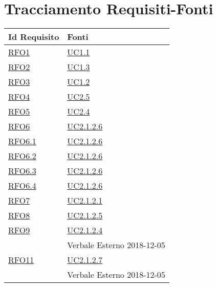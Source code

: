 \section{Tracciamento Requisiti-Fonti}
\normalsize
\begin{longtable}{|>{\centering}m{5cm}|m{5cm}<{\centering}|}
	\hline
	\textbf{Id Requisito} & \textbf{Fonti}\\
	\hline
	\endhead
	\hyperlink{RFO1}{RFO1} & \hyperref[UC1.1]{UC1.1}\\ \hline
	
	\hyperlink{RFO2}{RFO2} & \hyperref[UC1.3]{UC1.3}\\ \hline
	
	\hyperlink{RFO3}{RFO3} & \hyperref[UC1.2]{UC1.2}\\ \hline
	
	\hyperlink{RFO4}{RFO4} & \hyperref[UC2.5]{UC2.5}\\ \hline
	
	\hyperlink{RFO5}{RFO5} & \hyperref[UC2.4]{UC2.4}\\ \hline
	
	\hyperlink{RFO6}{RFO6} & \hyperref[UC2.1.2.6]{UC2.1.2.6}\\ \hline
	
	\hyperlink{RFO6.1}{RFO6.1} & \hyperref[UC2.1.2.6]{UC2.1.2.6}\\ \hline
	
	\hyperlink{RFO6.2}{RFO6.2} & \hyperref[UC2.1.2.6]{UC2.1.2.6}\\ \hline
	
	\hyperlink{RFO6.3}{RFO6.3} & \hyperref[UC2.1.2.6]{UC2.1.2.6}\\ \hline
	
	\hyperlink{RFO6.4}{RFO6.4} & \hyperref[UC2.1.2.6]{UC2.1.2.6}\\ \hline
	
	\hyperlink{RFO7}{RFO7} & \hyperref[UC2.1.2.1]{UC2.1.2.1}\\ \hline
	
	\hyperlink{RFO8}{RFO8} & \hyperref[UC2.1.2.5]{UC2.1.2.5}\\ \hline
	
	\hyperlink{RFO9}{RFO9} & \hyperref[UC2.1.2.4]{UC2.1.2.4}\\& Verbale Esterno 2018-12-05\\ \hline
	
	\hyperlink{RFO11}{RFO11} & \hyperref[UC2.1.2.7]{UC2.1.2.7}\\& Verbale Esterno 2018-12-05\\ \hline
	

\end{longtable}
